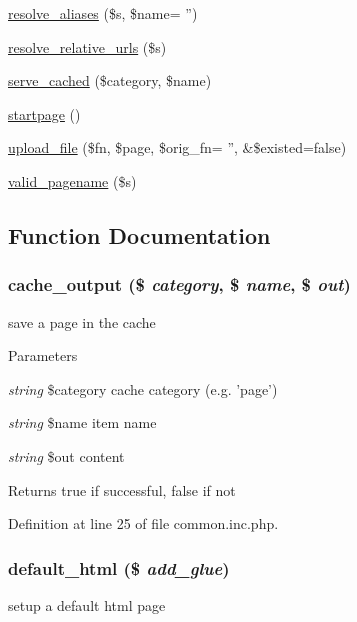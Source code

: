 \begin{DoxyCompactItemize}
\item 
\hyperlink{common_8inc_8php_a78992fdfae6cd9d7d4e8053d004d1709}{resolve\_\-aliases} (\$s, \$name= '')
\item 
\hyperlink{common_8inc_8php_a81eb70073067db81ab43829870f15e6d}{resolve\_\-relative\_\-urls} (\$s)
\item 
\hyperlink{common_8inc_8php_aac90387dcab722e243df2d083f8d6a00}{serve\_\-cached} (\$category, \$name)
\item 
\hyperlink{common_8inc_8php_a0a3ee1e9beca572266648f17b9c4c75f}{startpage} ()
\item 
\hyperlink{common_8inc_8php_a4659077c34b709eec75f9897ea07e55a}{upload\_\-file} (\$fn, \$page, \$orig\_\-fn= '', \&\$existed=false)
\item 
\hyperlink{common_8inc_8php_a0ef613d233a6e62f7e631b8dfcd710bf}{valid\_\-pagename} (\$s)
\end{DoxyCompactItemize}


\subsection{Function Documentation}
\hypertarget{common_8inc_8php_a6cceb5c6a3c421c18e925515c78f6dfd}{
\subsubsection[{cache\_\-output}]{\setlength{\rightskip}{0pt plus 5cm}cache\_\-output (\$ {\em category}, \/  \$ {\em name}, \/  \$ {\em out})}}
\label{common_8inc_8php_a6cceb5c6a3c421c18e925515c78f6dfd}
save a page in the cache


\begin{DoxyParams}{Parameters}
\item[{\em string}]\$category cache category (e.g. 'page') \item[{\em string}]\$name item name \item[{\em string}]\$out content \end{DoxyParams}
\begin{DoxyReturn}{Returns}
true if successful, false if not 
\end{DoxyReturn}


Definition at line 25 of file common.inc.php.

\hypertarget{common_8inc_8php_a8916cb6ec34ceeb3f48c86655c305974}{
\subsubsection[{default\_\-html}]{\setlength{\rightskip}{0pt plus 5cm}default\_\-html (\$ {\em add\_\-glue})}}
\label{common_8inc_8php_a8916cb6ec34ceeb3f48c86655c305974}
setup a default html page

